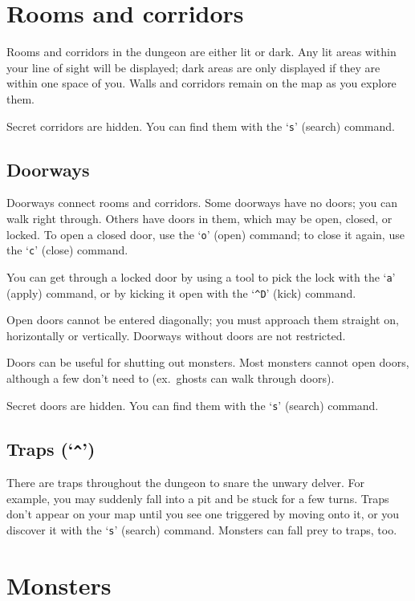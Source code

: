 \section{Rooms and corridors}

Rooms and corridors in the dungeon are either lit or dark.
Any lit areas within your line of sight will be displayed;
dark areas are only displayed if they are within one space of you. 
Walls and corridors remain on the map as you explore them.

Secret corridors are hidden.  You can find them with the `{\tt s}' (search)
command.

\subsection*{Doorways}

Doorways connect rooms and corridors.  Some doorways have no doors;
you can walk right through.  Others have doors in them, which may be
open, closed, or locked.  To open a closed door, use the `{\tt o}' (open)
command; to close it again, use the `{\tt c}' (close) command.

You can get through a locked door by using a tool to pick the lock
with the `{\tt a}' (apply) command, or by kicking it open with the
`{\tt \^{}D}' (kick) command.

Open doors cannot be entered diagonally; you must approach them
straight on, horizontally or vertically.  Doorways without doors are
not restricted.

Doors can be useful for shutting out monsters.  Most monsters cannot
open doors, although a few don't need to (ex.\ ghosts can walk through
doors).

Secret doors are hidden.  You can find them with the `{\tt s}' (search)
command.

\subsection*{Traps (`{\tt \^{}}')}

There are traps throughout the dungeon to snare the unwary delver.
For example, you may suddenly fall into a pit and be stuck for a few
turns.  Traps don't appear on your map until you see one triggered
by moving onto it, or you discover it with the `{\tt s}' (search) command.
Monsters can fall prey to traps, too.

\section{Monsters}

